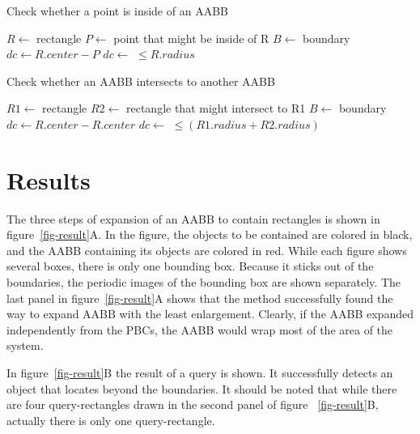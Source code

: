 \documentclass[10pt,letterpaper,twocolumn]{article}
\begin{document}
\begin{algorithm}[tbh]
    \caption{Check whether a point is inside of an AABB}
    \begin{algorithmic}
        \State $R \gets$ rectangle
        \State $P \gets$ point that might be inside of R
        \State $B \gets$ boundary
            \State $dc \gets R.center - P$
            \State $dc \gets$ 
            \State \Return {} $\leq R.radius$
        \EndFunction
     \end{algorithmic}
\end{algorithm}

\begin{algorithm}[tbh]
    \caption{Check whether an AABB intersects to another AABB}
    \begin{algorithmic}
        \State $R1 \gets$ rectangle
        \State $R2 \gets$ rectangle that might intersect to R1
        \State $B  \gets$ boundary
            \State $dc \gets R.center - R.center$
            \State $dc \gets$ 
            \State \Return {} $\leq (R1.radius + R2.radius)$
        \EndFunction
     \end{algorithmic}
\end{algorithm}

\section*{Results}


The three steps of expansion of an AABB to contain rectangles is shown in
figure~\ref{fig-result}A. In the figure, the objects to be contained are colored
in black, and the AABB containing its objects are colored in red.
While each figure shows several boxes, there is only one bounding box.
Because it sticks out of the boundaries, the periodic images of the bounding box
are shown separately.
The last panel in figure~\ref{fig-result}A shows that the method successfully
found the way to expand AABB with the least enlargement. Clearly, if the AABB
expanded independently from the PBCs, the AABB would wrap most of the area of
the system.

In figure~\ref{fig-result}B the result of a query is shown. It successfully
detects an object that locates beyond the boundaries. It should be noted that
while there are four query-rectangles drawn in the second panel of figure
~\ref{fig-result}B, actually there is only one query-rectangle.
\end{document}
